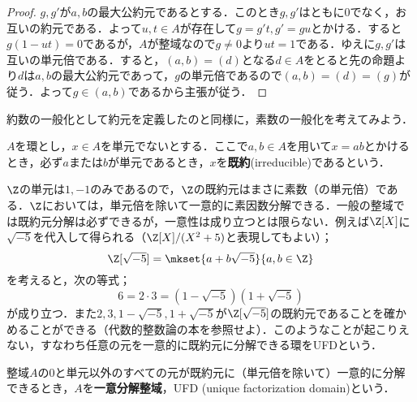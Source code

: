 \begin{proof}
	$g,g'$が$a,b$の最大公約元であるとする．このとき$g,g'$はともに0でなく，お互いの約元である．よって$u,t\in A$が存在して$g=g't,g'=gu$とかける．すると$g(1-ut)=0$であるが，$A$が整域なので$g\neq0$より$ut=1$である．ゆえに$g,g'$は互いの単元倍である．すると，$(a,b)=(d)$となる$d\in A$をとると先の命題より$d$は$a,b$の最大公約元であって，$g$の単元倍であるので$(a,b)=(d)=(g)$が従う．よって$g\in (a,b)$であるから主張が従う．
\end{proof}

約数の一般化として約元を定義したのと同様に，素数の一般化を考えてみよう．

\begin{defi}[既約元]\label{defi:既約元}
	$A$を環とし，$x\in A$を単元でないとする．ここで$a,b\in A$を用いて$x=ab$とかけるとき，必ず$a$または$b$が単元であるとき，$x$を\textbf{既約}(irreducible)であるという．
\end{defi}

$\Z$の単元は$1,-1$のみであるので，$\Z$の既約元はまさに素数（の単元倍）である．$\Z$においては，単元倍を除いて一意的に素因数分解できる．一般の整域では既約元分解は必ずできるが，一意性は成り立つとは限らない．例えば$\Z[X]$に$\sqrt{-5}$を代入して得られる（$\Z[X]/(X^2+5)$と表現してもよい）；
\[\Z[\sqrt{-5}]=\mkset{a+b\sqrt{-5}}{a,b\in\Z}\]
を考えると，次の等式；
\[6=2\cdot 3=(1-\sqrt{-5})(1+\sqrt{-5})\]
が成り立つ．また$2,3,1-\sqrt{-5},1+\sqrt{-5}$が$\Z[\sqrt{-5}]$の既約元であることを確かめることができる（代数的整数論の本を参照せよ）．このようなことが起こりえない，すなわち任意の元を一意的に既約元に分解できる環をUFDという．

\begin{defi}[UFD]
	整域$A$の$0$と単元以外のすべての元が既約元に（単元倍を除いて）一意的に分解できるとき，$A$を\textbf{一意分解整域}，UFD (unique factorization domain)という．
\end{defi}

